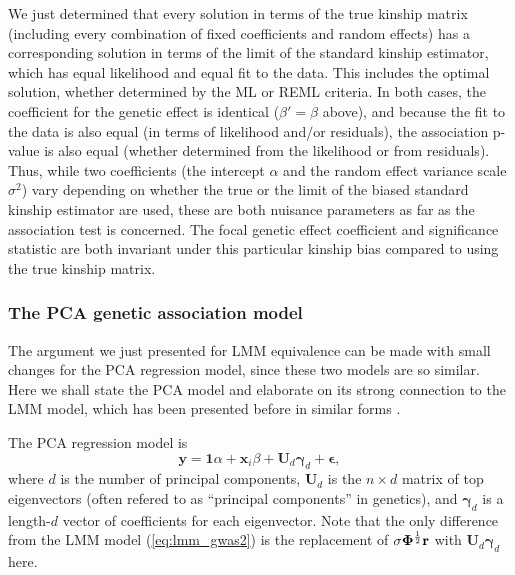 \documentclass[11pt]{article}
\newcommand{\kinMat}{%
  \ensuremath{%
    \mathbf{\Phi}
  }%
  \xspace%
}%
\begin{document}
We just determined that every solution in terms of the true kinship matrix (including every combination of fixed coefficients and random effects) has a corresponding solution in terms of the limit of the standard kinship estimator, which has equal likelihood and equal fit to the data.
This includes the optimal solution, whether determined by the ML or REML criteria.
In both cases, the coefficient for the genetic effect is identical ($\beta' = \beta$ above), and because the fit to the data is also equal (in terms of likelihood and/or residuals), the association p-value is also equal (whether determined from the likelihood or from residuals).
Thus, while two coefficients (the intercept $\alpha$ and the random effect variance scale $\sigma^2$) vary depending on whether the true or the limit of the biased standard kinship estimator are used, these are both nuisance parameters as far as the association test is concerned.
The focal genetic effect coefficient and significance statistic are both invariant under this particular kinship bias compared to using the true kinship matrix.

\subsubsection{The PCA genetic association model}

The argument we just presented for LMM equivalence can be made with small changes for the PCA regression model, since these two models are so similar.
Here we shall state the PCA model and elaborate on its strong connection to the LMM model, which has been presented before in similar forms \citep{astle_population_2009, hoffman_correcting_2013}.

The PCA regression model is
\begin{equation}
  \label{eq:pca_gwas}
  \mathbf{y}
  =
  \mathbf{1} \alpha + \mathbf{x}_i \beta + \mathbf{U}_d \mathbf{\gamma}_d + \mathbf{\epsilon}
  ,
\end{equation}
where
$d$ is the number of principal components,
$\mathbf{U}_d$ is the $n \times d$ matrix of top eigenvectors (often refered to as ``principal components'' in genetics),
and $\mathbf{\gamma}_d$ is a length-$d$ vector of coefficients for each eigenvector.
Note that the only difference from the LMM model (\cref{eq:lmm_gwas2}) is the replacement of $\sigma \kinMat^\frac{1}{2} \mathbf{r}$ with $\mathbf{U}_d \mathbf{\gamma}_d$ here.
\end{document}
